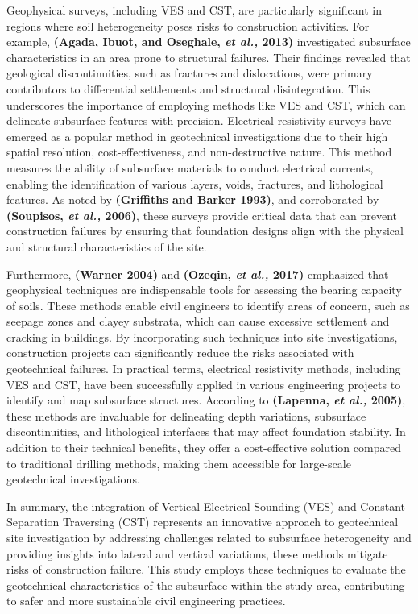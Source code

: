 \documentclass[12pt,a4paper]{report}
\begin{document}
Geophysical surveys, including VES and CST, are particularly significant in regions where soil heterogeneity poses risks to construction activities. For example, \textbf{(Agada, Ibuot, and Oseghale, \textit{et al.,} 2013)} investigated subsurface characteristics in an area prone to structural failures. Their findings revealed that geological discontinuities, such as fractures and dislocations, were primary contributors to differential settlements and structural disintegration. This underscores the importance of employing methods like VES and CST, which can delineate subsurface features with precision. Electrical resistivity surveys have emerged as a popular method in geotechnical investigations due to their high spatial resolution, cost-effectiveness, and non-destructive nature. This method measures the ability of subsurface materials to conduct electrical currents, enabling the identification of various layers, voids, fractures, and lithological features. As noted by \textbf{(Griffiths and Barker 1993)}, and corroborated by \textbf{(Soupisos, \textit{et al.,} 2006)}, these surveys provide critical data that can prevent construction failures by ensuring that foundation designs align with the physical and structural characteristics of the site.

Furthermore, \textbf{(Warner 2004)} and \textbf{(Ozeqin, \textit{et al.,} 2017)} emphasized that geophysical techniques are indispensable tools for assessing the bearing capacity of soils. These methods enable civil engineers to identify areas of concern, such as seepage zones and clayey substrata, which can cause excessive settlement and cracking in buildings. By incorporating such techniques into site investigations, construction projects can significantly reduce the risks associated with geotechnical failures. In practical terms, electrical resistivity methods, including VES and CST, have been successfully applied in various engineering projects to identify and map subsurface structures. According to \textbf{(Lapenna, \textit{et al.,} 2005)}, these methods are invaluable for delineating depth variations, subsurface discontinuities, and lithological interfaces that may affect foundation stability. In addition to their technical benefits, they offer a cost-effective solution compared to traditional drilling methods, making them accessible for large-scale geotechnical investigations.

In summary, the integration of Vertical Electrical Sounding (VES) and Constant Separation Traversing (CST) represents an innovative approach to geotechnical site investigation by addressing challenges related to subsurface heterogeneity and providing insights into lateral and vertical variations, these methods mitigate risks of construction failure. This study employs these techniques to evaluate the geotechnical characteristics of the subsurface within the study area, contributing to safer and more sustainable civil engineering practices.
\end{document}

